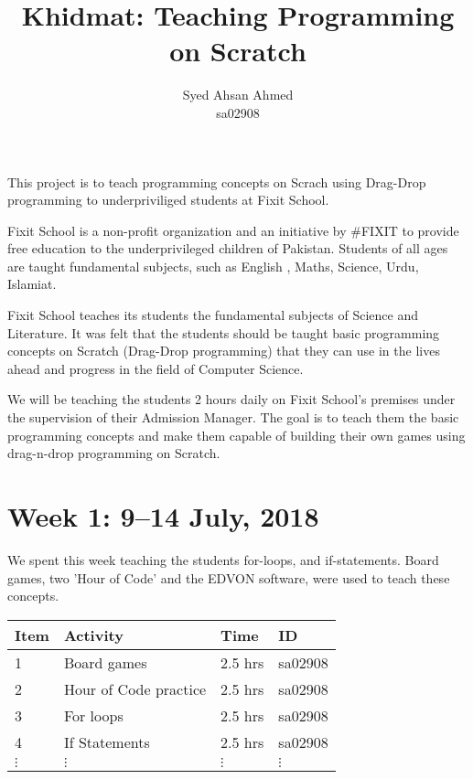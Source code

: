 \documentclass{article}
\title {Khidmat: Teaching Programming on Scratch}
\author{
  Syed Ahsan Ahmed\\ sa02908
}
\date{}
\begin{document}
\maketitle

This project is to teach programming concepts on Scrach using Drag-Drop programming to underpriviliged students at Fixit School.

Fixit School is a non-profit organization and an initiative by #FIXIT to provide free education to the underprivileged children of Pakistan. Students of all ages are taught fundamental subjects, such as English , Maths, Science, Urdu, Islamiat. 

Fixit School teaches its students the fundamental subjects of Science and Literature. It was felt that the students should be taught basic programming concepts on Scratch (Drag-Drop programming) that they can use in the lives ahead and progress in the field of Computer Science.

We will be teaching the students 2 hours daily on Fixit School's premises under the supervision of their Admission Manager. The goal is to teach them the basic programming concepts and make them capable of building their own games using drag-n-drop programming on Scratch.

\newpage %
\section*{Week 1: 9--14 July, 2018}

We spent this week teaching the students for-loops, and if-statements. Board games, two 'Hour of Code' and the EDVON software, were used to teach these concepts.

\begin{tabular}{|l|l|l|l|}
  \hline
  Item 	& Activity & Time & ID \\\hline\hline
  1	& Board games & 2.5 hrs & sa02908 \\\hline
  2	& Hour of Code practice & 2.5 hrs & sa02908 \\\hline
  3	& For loops & 2.5 hrs & sa02908 \\\hline
  4 & If Statements & 2.5 hrs & sa02908 \\\hline
  $\vdots$ & $\vdots$ & $\vdots$ & $\vdots$ \\\hline
\end{tabular}
\end{document}
